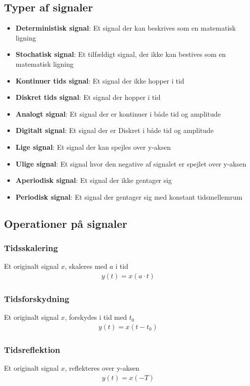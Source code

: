 \subsection{Typer af signaler}
	\begin{itemize}
		\item \textbf{Deterministisk signal}: Et signal der kan beskrives som en matematisk ligning
		\item \textbf{Stochatisk signal}: Et tilfældigt signal, der ikke kan bestives som en matematisk ligning
		\item \textbf{Kontinuer tids signal}: Et signal der ikke hopper i tid
		\item \textbf{Diskret tids signal}: Et signal der hopper i tid
		\item \textbf{Analogt signal}: Et signal der er kontinuer i både tid og amplitude
		\item \textbf{Digitalt signal}: Et signal der er Diskret i både tid og amplitude
		\item \textbf{Lige signal}: Et signal der kan spejles over y-aksen
		\item \textbf{Ulige signal}: Et signal hvor den negative af signalet er spejlet over y-aksen
		\item \textbf{Aperiodisk signal}: Et signal der ikke gentager sig
		\item \textbf{Periodisk signal}: Et signal der gentager sig med konstant tidsmellemrum
	\end{itemize}

\subsection{Operationer på signaler}
	\subsubsection{Tidsskalering}
		Et originalt signal $x$, skaleres med $a$ i tid
		\begin{align}
			y(t)=x(a\cdot t)
		\end{align}

	\subsubsection{Tidsforskydning}
		Et originalt signal $x$, forskydes i tid med $t_0$
		\begin{align}
			y(t)=x(t-t_0)
		\end{align}

	\subsubsection{Tidsreflektion}
		Et originalt signal $x$, reflekteres over y-aksen
		\begin{align}
			y(t)=x(-T)
		\end{align}

